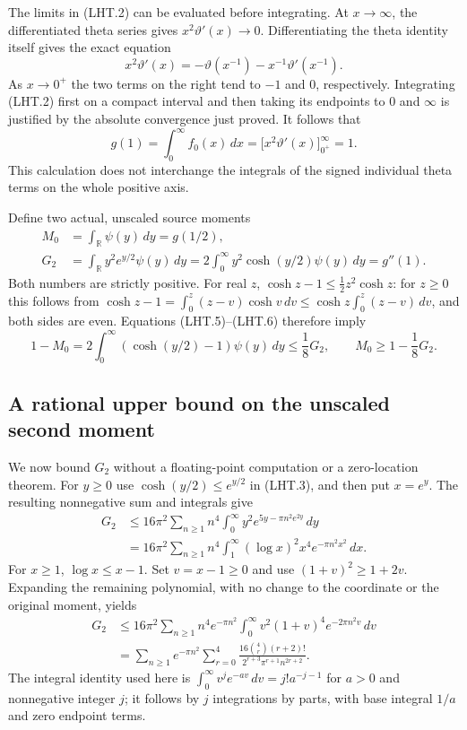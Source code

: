 The limits in (LHT.2) can be evaluated before integrating.
At $x\to\infty$, the differentiated theta series gives
$x^2\vartheta'(x)\to0$.  Differentiating the theta identity itself
gives the exact equation
\[
 x^2\vartheta'(x)
       =-\vartheta(x^{-1})-x^{-1}\vartheta'(x^{-1}).
\tag{LHT.4}
\]
As $x\to0^+$ the two terms on the right tend to $-1$ and $0$,
respectively.  Integrating (LHT.2) first on a compact interval and
then taking its endpoints to $0$ and $\infty$ is justified by the
absolute convergence just proved.  It follows that
\[
 g(1)=\int_0^\infty f_0(x)\,dx
     =\bigl[x^2\vartheta'(x)\bigr]_{0^+}^{\infty}=1.
\tag{LHT.5}
\]
This calculation does not interchange the integrals of the signed
individual theta terms on the whole positive axis.

Define two actual, unscaled source moments
\[
 \begin{split}
 M_0&=\int_{\mathbb R}\psi(y)\,dy=g(1/2),\\
 G_2&=\int_{\mathbb R}y^2e^{y/2}\psi(y)\,dy
       =2\int_0^\infty y^2\cosh(y/2)\psi(y)\,dy=g''(1).
 \end{split}
\tag{LHT.6}
\]
Both numbers are strictly positive.  For real $z$,
$\cosh z-1\leq \frac12 z^2\cosh z$: for $z\geq0$ this follows from
$\cosh z-1=\int_0^z(z-v)\cosh v\,dv
\leq\cosh z\int_0^z(z-v)\,dv$, and both sides are even.
Equations (LHT.5)--(LHT.6) therefore imply
\[
 1-M_0
 =2\int_0^\infty (\cosh(y/2)-1)\psi(y)\,dy
 \leq \frac18 G_2,
 \qquad M_0\geq1-\frac18G_2.
\tag{LHT.7}
\]

\subsection{A rational upper bound on the unscaled second moment}

We now bound $G_2$ without a floating-point computation or a
zero-location theorem.  For $y\geq0$ use
$\cosh(y/2)\leq e^{y/2}$ in (LHT.3), and then put $x=e^y$.
The resulting nonnegative sum and integrals give
\[
 \begin{split}
 G_2
 &\leq16\pi^2\sum_{n\geq1}n^4
      \int_0^\infty y^2e^{5y-\pi n^2e^{2y}}\,dy\\
 &=16\pi^2\sum_{n\geq1}n^4
      \int_1^\infty (\log x)^2x^4e^{-\pi n^2x^2}\,dx.
 \end{split}
\tag{LHT.8}
\]
For $x\geq1$, $\log x\leq x-1$.  Set $v=x-1\geq0$ and use
$(1+v)^2\geq1+2v$.  Expanding the remaining polynomial, with no
change to the coordinate or the original moment, yields
\[
 \begin{split}
 G_2
 &\leq16\pi^2\sum_{n\geq1}n^4e^{-\pi n^2}
         \int_0^\infty v^2(1+v)^4e^{-2\pi n^2v}\,dv\\
 &=\sum_{n\geq1}e^{-\pi n^2}
     \sum_{r=0}^{4}
       \frac{16\binom4r(r+2)!}
          {2^{r+3}\pi^{r+1}n^{2r+2}}.
 \end{split}
\tag{LHT.9}
\]
The integral identity used here is
$\int_0^\infty v^j e^{-av}\,dv=j!a^{-j-1}$ for $a>0$ and
nonnegative integer $j$; it follows by $j$ integrations by parts,
with base integral $1/a$ and zero endpoint terms.

